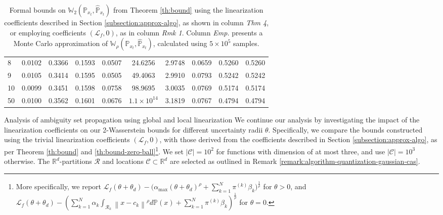 \documentclass[11pt, a4paper, oneside,reqno]{amsart}
\makeatletter
\def\subsection{\@startsection{subsection}{2}%
	\z@{.5\linespacing\@plus.7\linespacing}{.5\linespacing}%
	{\normalfont\bfseries}}
\theoremstyle{plain}
\def\prob{\mathbb{P}}
\def\probHat{\hat{\mathbb{P}}}
\def\wasserstein{{\mathbb{W}}}
\newcommand{\norm}[1]{\left\lVert#1\right\rVert}
\def\lipschitz{{\mathcal{L}}}
\def\realNum{{\mathbb{R}}}
\def\sL{{\mathcal{L}}}
\def\sR{{\mathcal{R}}}
\def\bsR{{\bm{\mathcal{R}}}}
\def\bsC{{\bm{\mathcal{C}}}}
\def\vpi{{{\pi}}}
\newcommand{\evpi}[1]{{\vpi^{(#1)}}}
\makeatother
\begin{document}
\begin{table}[t]
\begin{tabular}{lccccccccc}
    8                  & 0.0102             & 0.3366         & \multicolumn{1}{c|}{0.1593}         & 0.0507             & 24.6256                      & \multicolumn{1}{c|}{2.9748}         & 0.0659             & 0.5260         & 0.5260         \\
    9                  & 0.0105             & 0.3414         & \multicolumn{1}{c|}{0.1595}         & 0.0505             & 49.4063                      & \multicolumn{1}{c|}{2.9910}         & 0.0793             & 0.5242         & 0.5242         \\
    10                 & 0.0099             & 0.3451         & \multicolumn{1}{c|}{0.1598}         & 0.0758             & 98.9695                      & \multicolumn{1}{c|}{3.0035}         & 0.0769             & 0.5174         & 0.5174         \\ \hline
    50                 & 0.0100             & 0.3562         & \multicolumn{1}{c|}{0.1601}         & 0.0676             & $1.1 \times 10^{14}$ & \multicolumn{1}{c|}{3.1819}         & 0.0767             & 0.4794         & 0.4794        
    \end{tabular}
    \caption{Formal bounds on $\wasserstein_2(\prob_{x_t}, \probHat_{x_t})$ from Theorem \ref{th:bound} using the linearization coefficients described in Section \ref{subsection:approx-algo}, as shown in column \textit{Thm 4}, or employing coefficients \((\lipschitz_f,0)\), as in column \textit{Rmk 1}. Column \textit{Emp.} presents a Monte Carlo approximation of $\wasserstein_\rho(\prob_{x_t}, \probHat_{x_t})$, calculated using $5 \times 10^5$ samples.
    }
    \label{table:results-bounds-system-10-time-steps}
\end{table}


\subsection{Analysis of ambiguity set propagation using global and local linearization}\label{subsection:experiments-impact-theta}
We continue our analysis by investigating the impact of the linearization coefficients on our 2-Wasserstein bounds for different uncertainty radii $\theta$. 
Specifically, we compare the bounds constructed using the trivial linearization coefficients \((\lipschitz_f,0)\), with those derived from the coefficients described in Section \ref{subsection:approx-algo}, as per Theorem \ref{th:bound} and \ref{th:bound-zero-ball}\footnote{More specifically, we report $\sL_f (\theta + \theta_d) - \bigg( \alpha_{\max} (\theta+\theta_d)^\rho + \sum_{k=1}^{N} \evpi{k}\beta_k \bigg)^\frac{1}{\rho}$ for $\theta>0$, and $\sL_f (\theta + \theta_d) - \left( \sum_{k=1}^N \alpha_k \int_{\sR_k} \norm{x-c_k}^\rho d\prob(x) + \sum_{k=1}^N \evpi{k} \beta_k  \right)^\frac{1}{\rho}$ for $\theta=0$.}. 
We set $|\bsC| = 10^2$ for functions with dimension of at most three, and use $|\bsC| = 10^3$ otherwise. The $\realNum^d$-partitions $\bsR$ and locations $\bsC \subset \realNum^d$ are selected as outlined in Remark \ref{remark:algorithm-quantization-gaussian-cas}.
\end{document}
